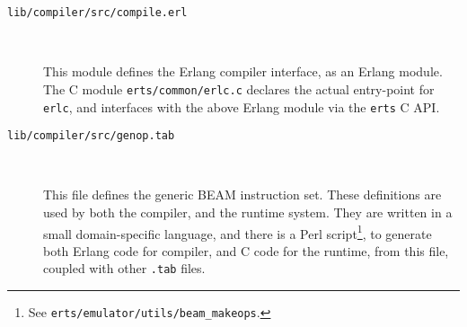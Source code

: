 \begin{description}

\item[\texttt{lib/compiler/src/compile.erl}]~

This module defines the Erlang compiler interface, as an Erlang
module. The C module \texttt{erts/common/erlc.c} declares the actual
entry-point for \texttt{erlc}, and interfaces with the above Erlang
module via the \texttt{erts} C API.

\item[\texttt{lib/compiler/src/genop.tab}]~

This file defines the generic BEAM instruction set. These definitions
are used by both the compiler, and the runtime system. They are
written in a small domain-specific language, and there is a Perl
script\footnote{See \texttt{erts/emulator/utils/beam\_makeops}.}, to
generate both Erlang code for compiler, and C code for the runtime,
from this file, coupled with other \texttt{.tab} files.

\end{description}
